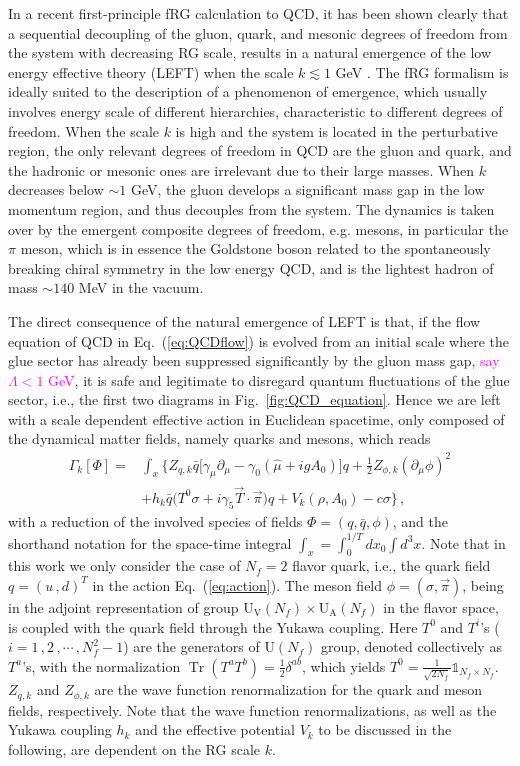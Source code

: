 \documentclass[%
reprint,
superscriptaddress,
showpacs,preprintnumbers,
 amsmath,amssymb,
 aps,
prd,
]{revtex4-1}
\newcommand{\Tr}{\ensuremath{\operatorname{Tr}}}
\def\Fig#1{Fig.~\ref{#1}} \def\Tab#1{Tab.~\ref{#1}}
\def\Eq#1{Eq.~(\ref{#1})}
\newcommand{\colfab}[1]{\textcolor{magenta}{#1}}
\begin{document}
In a recent first-principle fRG calculation to QCD, it has been shown clearly that a sequential decoupling of the gluon, quark, and mesonic degrees of freedom from the system with decreasing RG scale, results in a natural emergence of the low energy effective theory (LEFT) when the scale $k\lesssim 1$ GeV \cite{Fu:2019hdw}. The fRG formalism is ideally suited to the description of a phenomenon of emergence, which usually involves energy scale of different hierarchies, characteristic to different degrees of freedom. When the scale $k$ is high and the system is located in the perturbative region, the only relevant degrees of freedom in QCD are the gluon and quark, and the hadronic or mesonic ones are irrelevant due to their large masses. When $k$ decreases below $\sim 1$ GeV, the gluon develops a significant mass gap in the low momentum region, and thus decouples from the system. The dynamics is taken over by the emergent composite degrees of freedom, e.g. mesons, in particular the $\pi$ meson, which is in essence the Goldstone boson related to the spontaneously breaking chiral symmetry in the low energy QCD, and is the lightest hadron of mass $\sim 140$ MeV in the vacuum. 

The direct consequence of the natural emergence of LEFT is that,  if the flow equation of QCD in \Eq{eq:QCDflow} is evolved from an initial scale where the glue sector has already been suppressed significantly by the gluon mass gap, \colfab{say $\Lambda < 1$ GeV}, it is safe and legitimate to disregard quantum fluctuations of the glue sector, i.e., the first two diagrams in \Fig{fig:QCD_equation}. Hence we are left with a scale dependent effective action in Euclidean spacetime, only composed of the dynamical matter fields, namely quarks and mesons, which reads
%
\begin{align}
\Gamma_k[\Phi]=&\int_x \bigg\{Z_{q,k}\bar{q} \Big [\gamma_\mu \partial_\mu -\gamma_0(\hat\mu+igA_0) \Big ]q+\frac{1}{2}Z_{\phi,k}(\partial_\mu \phi)^2 \nonumber\\[2ex]
&+h_k\bar{q}\big(T^0\sigma+i\gamma_5\vec{T}\cdot \vec{\pi}\big)q+V_k(\rho,A_0)-c\sigma \bigg\}\,,\label{eq:action}
\end{align}
%
with a reduction of the involved species of fields $\Phi=(q,\bar q,\phi)$, and the shorthand notation for the space-time integral $\int_{x}=\int_0^{1/T}d x_0 \int d^3 x$. Note that in this work we only consider the case of $N_f=2$ flavor quark, i.e., the quark field $q=(u\,,d)^{T}$ in the action \Eq{eq:action}. The meson field $\phi=\left(\sigma,\vec{\pi}\right)$, being in the adjoint representation of group $\mathrm{U_V}(N_f)\times\mathrm{U_A}(N_f)$ in the flavor space, is coupled with the quark field through the Yukawa coupling. Here $T^0$ and $T^{i}$'s ($i=1\,,2\,,\cdots\,,N_f^2-1$) are the generators of $\mathrm{U}(N_f)$ group, denoted collectively as $T^a$'s, with the normalization $\Tr(T^{a}T^{b})=\frac{1}{2}\delta^{ab}$, which yields $T^{0}=\frac{1}{\sqrt{2N_{f}}}\mathbb{1}_{N_{f}\times N_{f}}$. $Z_{q,k}$ and $Z_{\phi,k}$ are the wave function renormalization for the quark and meson fields, respectively. Note that the wave function renormalizations, as well as the Yukawa coupling $h_k$ and the effective potential $V_k$ to be discussed in the following, are dependent on the RG scale $k$. 
\end{document}
